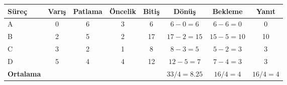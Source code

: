 \begin{tabular}{@{}lccccccc@{}}
\toprule
\textbf{Süreç} & \textbf{Varış} & \textbf{Patlama} & \textbf{Öncelik} & \textbf{Bitiş} & \textbf{Dönüş} & \textbf{Bekleme} & \textbf{Yanıt}\\
\midrule
A & 0 & 6 & 3 & 6 & $6-0=6$ & $6-6=0$ & 0\\
B & 2 & 5 & 2 & 17 & $17-2=15$ & $15-5=10$ & 10\\
C & 3 & 2 & 1 & 8 & $8-3=5$ & $5-2=3$ & 3\\
D & 5 & 4 & 4 & 12 & $12-5=7$ & $7-4=3$ & 3\\
\midrule
\textbf{Ortalama} &  &  &  &  & $33/4=8.25$ & $16/4=4$ & $16/4=4$\\
\bottomrule
\end{tabular}
